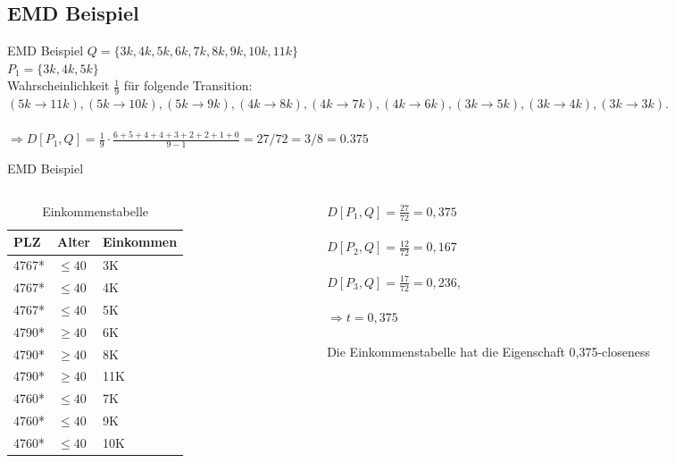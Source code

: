 \subsection{EMD Beispiel}
\begin{frame}{EMD Beispiel}
	$Q = \{3k, 4k, 5k, 6k, 7k, 8k, 9k, 10k, 11k\}$\\
	$P_1 = \{3k, 4k, 5k\}$ \\
	Wahrscheinlichkeit $\frac{1}{9}$ für folgende Transition:
	$(5k\rightarrow 11k), (5k\rightarrow 10k), (5k \rightarrow 9k),
	(4k \rightarrow 8k), (4k\rightarrow 7k), (4k \rightarrow 6k), (3k\rightarrow 5k), (3k\rightarrow 4k), (3k \rightarrow 3k).$\\
	\ \\
	$\Rightarrow D[P_1,Q]= \frac{1}{9} \cdot \frac{6 + 5 + 4 + 4 + 3 + 2 + 2 + 1 + 0}{9-1} = 27/72 = 3/8 = 0.375$
\end{frame}
\begin{frame} {EMD Beispiel}
	
	\begin{columns}[T]
		\begin{column}{0.5\textwidth}
			\begin{table}[]
				\centering
				\label{tclossenessExample}
				\begin{tabular}{|l|l|l|}
					\hline
					\textbf{PLZ}   & \textbf{Alter}    & \textbf{Einkommen} \\\hline
					4767* & $\le 40$ & 3K \\
					4767* & $\le 40$ & 4K \\
					4767* & $\le 40$ & 5K \\\hline
					4790* & $\ge 40$ & 6K \\
					4790* & $\ge 40$ & 8K \\
					4790* & $\ge 40$ & 11K \\\hline
					4760* & $\le 40$ & 7K \\
					4760* & $\le 40$ & 9K \\
					4760* & $\le 40$ & 10K \\\hline
				\end{tabular}
				\caption{Einkommenstabelle}
			\end{table}
		\end{column}
		
		\begin{column}{0.5\textwidth}
			$D[P_1,Q]=\frac{27}{72} = 0,375$\\
			\ \\
			$D[P_2,Q]=\frac{12}{72} = 0,167$\\
			\ \\
			$D[P_3,Q]=\frac{17}{72} = 0,236,$\\
			\ \\
			$\Rightarrow t=0,375$\\
			\ \\
			Die Einkommenstabelle hat die Eigenschaft 0,375-closeness	
		\end{column}
	\end{columns}
\end{frame}
